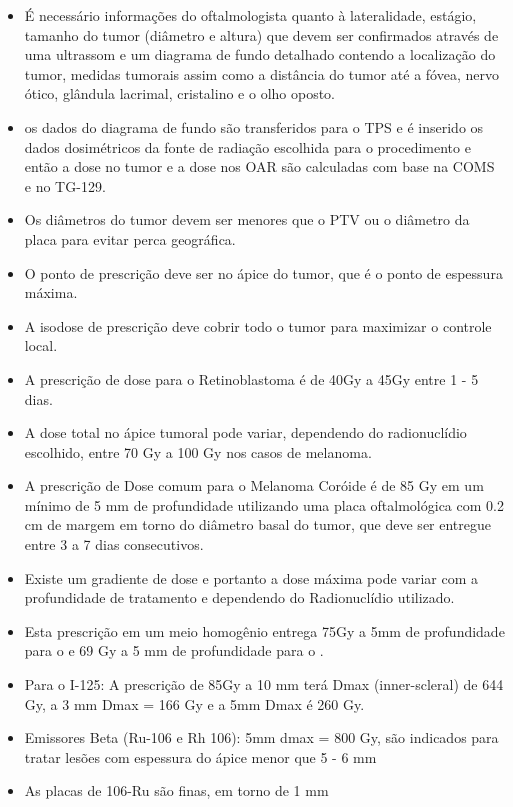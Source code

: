 \documentclass[11pt,a4paper]{article}
\begin{document}
    \begin{itemize}
        \item É necessário informações do oftalmologista quanto à lateralidade, estágio, tamanho do tumor (diâmetro e altura) que devem ser confirmados através de uma ultrassom e um diagrama de fundo detalhado contendo a localização do tumor, medidas tumorais assim como a distância do tumor até a fóvea, nervo ótico, glândula lacrimal,  cristalino e o olho oposto.
        \item os dados do diagrama de fundo são transferidos para o TPS e é inserido os dados dosimétricos da fonte de radiação escolhida para o procedimento e então a dose no tumor e a dose nos OAR são calculadas com base na COMS e no TG-129.
        \item Os diâmetros do tumor devem ser menores que o PTV ou o diâmetro da placa para evitar perca geográfica.
        \item O ponto de prescrição deve ser no ápice do tumor, que é o ponto de espessura máxima.
        \item A isodose de prescrição deve cobrir todo o tumor para maximizar o controle local.
        \item A prescrição de dose para o Retinoblastoma é de 40Gy a 45Gy entre 1 - 5 dias.
        \item A dose total no ápice tumoral pode variar, dependendo do radionuclídio escolhido, entre 70 Gy a 100 Gy nos casos de melanoma.
        \item A prescrição de Dose comum para o Melanoma Coróide é de 85 Gy em um mínimo de 5 mm de profundidade utilizando uma placa oftalmológica com 0.2 cm de margem em torno do diâmetro basal do tumor, que deve ser entregue entre 3 a 7 dias consecutivos.
        \item Existe um gradiente de dose e portanto a dose máxima pode variar com a profundidade de tratamento e dependendo do Radionuclídio utilizado.
        \item Esta prescrição em um meio homogênio entrega 75Gy a 5mm de profundidade para o  e 69 Gy a 5 mm de profundidade para o .
        \item Para o I-125: A prescrição de 85Gy a  10 mm terá Dmax (inner-scleral) de 644 Gy, a 3 mm Dmax = 166 Gy e a  5mm Dmax  é 260 Gy.
        \item Emissores Beta (Ru-106 e Rh 106): 5mm dmax = 800 Gy, são indicados para tratar lesões com espessura do ápice menor que 5 - 6 mm
        \item As placas de 106-Ru são finas, em torno de 1 mm

\end{itemize}
\end{document}

